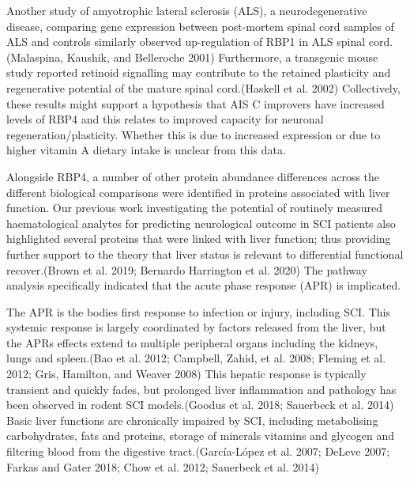 \documentclass[9pt,lineno]{elife}
\begin{document}
\begin{landscape}
\begin{landscape}
Another study of amyotrophic lateral sclerosis (ALS), a neurodegenerative disease, comparing gene expression between post-mortem spinal cord samples of ALS and controls similarly observed up-regulation of RBP1 in ALS spinal cord.(Malaspina, Kaushik, and Belleroche 2001) Furthermore, a transgenic mouse study reported retinoid signalling may contribute to the retained plasticity and regenerative potential of the mature spinal cord.(Haskell et al. 2002) Collectively, these results might support a hypothesis that AIS C improvers have increased levels of RBP4 and this relates to improved capacity for neuronal regeneration/plasticity.
Whether this is due to increased expression or due to higher vitamin A dietary intake is unclear from this data.

Alongside RBP4, a number of other protein abundance differences across the different biological comparisons were identified in proteins associated with liver function.
Our previous work investigating the potential of routinely measured haematological analytes for predicting neurological outcome in SCI patients also highlighted several proteins that were linked with liver function; thus providing further support to the theory that liver status is relevant to differential functional recover.(Brown et al. 2019; Bernardo Harrington et al. 2020) The pathway analysis specifically indicated that the acute phase response (APR) is implicated.

The APR is the bodies first response to infection or injury, including SCI.
This systemic response is largely coordinated by factors released from the liver, but the APRs effects extend to multiple peripheral organs including the kidneys, lungs and spleen.(Bao et al. 2012; Campbell, Zahid, et al. 2008; Fleming et al. 2012; Gris, Hamilton, and Weaver 2008) This hepatic response is typically transient and quickly fades, but prolonged liver inflammation and pathology has been observed in rodent SCI models.(Goodus et al. 2018; Sauerbeck et al. 2014) Basic liver functions are chronically impaired by SCI, including metabolising carbohydrates, fats and proteins, storage of minerals vitamins and glycogen and filtering blood from the digestive tract.(García-López et al. 2007; DeLeve 2007; Farkas and Gater 2018; Chow et al. 2012; Sauerbeck et al. 2014)


\end{landscape}
\end{landscape}
\end{document}
